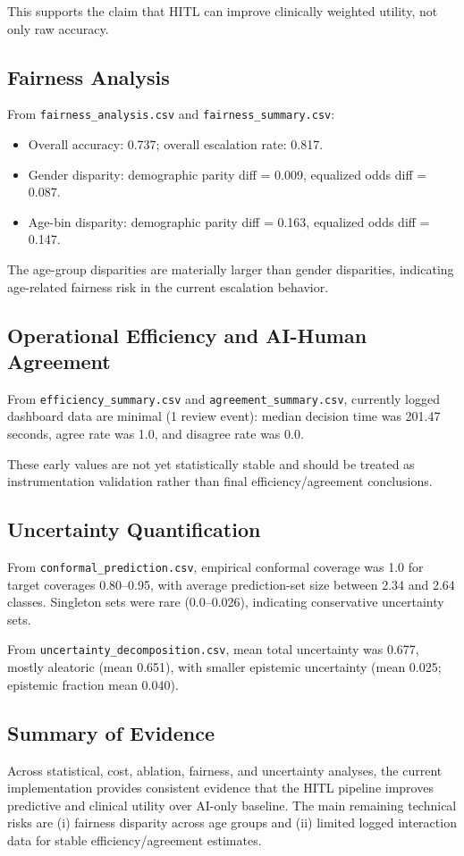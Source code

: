 ﻿\documentclass[12pt]{article}
\begin{document}
This supports the claim that HITL can improve clinically weighted utility, not only raw accuracy.

\subsection{Fairness Analysis}
From \texttt{fairness\_analysis.csv} and \texttt{fairness\_summary.csv}:
\begin{itemize}
    \item Overall accuracy: 0.737; overall escalation rate: 0.817.
    \item Gender disparity: demographic parity diff = 0.009, equalized odds diff = 0.087.
    \item Age-bin disparity: demographic parity diff = 0.163, equalized odds diff = 0.147.
\end{itemize}

The age-group disparities are materially larger than gender disparities, indicating age-related fairness risk in the current escalation behavior.

\subsection{Operational Efficiency and AI-Human Agreement}
From \texttt{efficiency\_summary.csv} and \texttt{agreement\_summary.csv}, currently logged dashboard data are minimal (1 review event): median decision time was 201.47 seconds, agree rate was 1.0, and disagree rate was 0.0.

These early values are not yet statistically stable and should be treated as instrumentation validation rather than final efficiency/agreement conclusions.

\subsection{Uncertainty Quantification}
From \texttt{conformal\_prediction.csv}, empirical conformal coverage was 1.0 for target coverages 0.80--0.95, with average prediction-set size between 2.34 and 2.64 classes. Singleton sets were rare (0.0--0.026), indicating conservative uncertainty sets.

From \texttt{uncertainty\_decomposition.csv}, mean total uncertainty was 0.677, mostly aleatoric (mean 0.651), with smaller epistemic uncertainty (mean 0.025; epistemic fraction mean 0.040).

\subsection{Summary of Evidence}
Across statistical, cost, ablation, fairness, and uncertainty analyses, the current implementation provides consistent evidence that the HITL pipeline improves predictive and clinical utility over AI-only baseline. The main remaining technical risks are (i) fairness disparity across age groups and (ii) limited logged interaction data for stable efficiency/agreement estimates.
\end{document}
